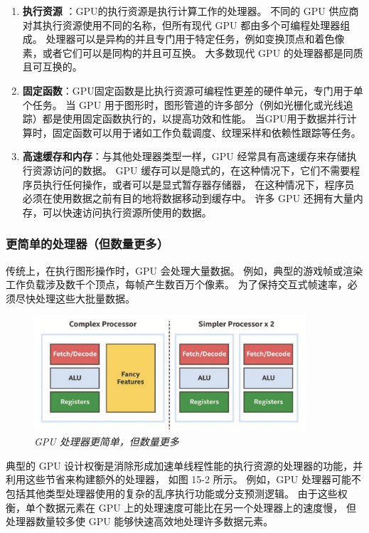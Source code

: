 \begin{enumerate}
	\item \textbf{执行资源} ：GPU的执行资源是执行计算工作的处理器。 
不同的 GPU 供应商对其执行资源使用不同的名称，但所有现代 GPU 都由多个可编程处理器组成。 
处理器可以是异构的并且专门用于特定任务，例如变换顶点和着色像素，或者它们可以是同构的并且可互换。 
大多数现代 GPU 的处理器都是同质且可互换的。

	\item \textbf{固定函数}：GPU固定函数是比执行资源可编程性更差的硬件单元，专门用于单个任务。 
当 GPU 用于图形时，图形管道的许多部分（例如光栅化或光线追踪）都是使用固定函数执行的，以提高功效和性能。 
当GPU用于数据并行计算时，固定函数可以用于诸如工作负载调度、纹理采样和依赖性跟踪等任务。

	\item \textbf{高速缓存和内存}：与其他处理器类型一样，GPU 经常具有高速缓存来存储执行资源访问的数据。 
GPU 缓存可以是隐式的，在这种情况下，它们不需要程序员执行任何操作，或者可以是显式暂存器存储器，
在这种情况下，程序员必须在使用数据之前有目的地将数据移动到缓存中。 
许多 GPU 还拥有大量内存，可以快速访问执行资源所使用的数据。
\end{enumerate}

\subsubsection{更简单的处理器（但数量更多）}
传统上，在执行图形操作时，GPU 会处理大量数据。 
例如，典型的游戏帧或渲染工作负载涉及数千个顶点，每帧产生数百万个像素。 
为了保持交互式帧速率，必须尽快处理这些大批量数据。

\begin{figure}[H]
	\centering
	\includegraphics[width=0.9\textwidth]{figs/F15.2.png}
	\caption{\textit{GPU 处理器更简单，但数量更多 }}
\end{figure}

典型的 GPU 设计权衡是消除形成加速单线程性能的执行资源的处理器的功能，并利用这些节省来构建额外的处理器，
如图 15-2 所示。 例如，GPU 处理器可能不包括其他类型处理器使用的复杂的乱序执行功能或分支预测逻辑。 
由于这些权衡，单个数据元素在 GPU 上的处理速度可能比在另一个处理器上的速度慢，
但处理器数量较多使 GPU 能够快速高效地处理许多数据元素。

